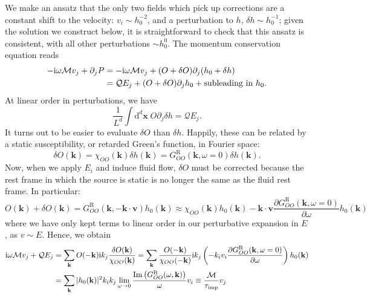 \documentclass[10pt, oneside]{book}
\begin{document}
\begin{doublespace}
We make an ansatz that the only two fields which pick up corrections are a constant shift to the velocity: $v_i \sim h_0^{-2}$,  and a perturbation to $h$, $\delta h\sim h^{-1}_0$;  given the solution we construct below, it is straightforward to check that this ansatz is consistent, with all other perturbations $\sim h^0_0$.    The momentum conservation equation reads \begin{align}
-\mathrm{i}\omega \mathcal{M} v_j + \partial_j P &= -\mathrm{i}\omega\mathcal{M} v_j  +  (O + \delta O) \partial_j (h_0+\delta h) \notag \\
&= \mathcal{Q}E_j + (O+\delta O)\partial_j h_0 + \text{subleading in }h_0.   \label{eq:233}
\end{align}At linear order in perturbations, we have \begin{equation}
\frac{1}{L^d}\int \mathrm{d}^d\mathbf{x}\; O\partial_j \delta h = \mathcal{Q}E_j. 
\end{equation}
It turns out to be easier to evaluate $\delta O$ than $\delta h$.  Happily, these can be related by a static susceptibility, or retarded Green's function, in Fourier space: \begin{equation}
\delta O(\mathbf{k}) = \chi_{OO}(\mathbf{k}) \delta h(\mathbf{k}) = G^{\mathrm{R}}_{OO}(\mathbf{k},\omega=0) \delta h(\mathbf{k}).   \label{eq:chiOO}
\end{equation}
Now, when we apply $E_i$ and induce fluid flow, $\delta O$ must be corrected because the rest frame in which the source is static is no longer the same as the fluid rest frame.  In particular: \begin{equation}
O(\mathbf{k}) + \delta O(\mathbf{k}) = G^{\mathrm{R}}_{OO}(\mathbf{k},-\mathbf{k}\cdot \mathbf{v}) h_0(\mathbf{k}) \approx \chi_{OO}(\mathbf{k}) h_0(\mathbf{k}) - \mathbf{k}\cdot \mathbf{v} \frac{\partial G^{\mathrm{R}}_{OO}(\mathbf{k},\omega = 0)}{\partial \omega} h_0(\mathbf{k}) 
\end{equation}
where we have only kept terms to linear order in our perturbative expansion in $E$, as $v\sim E$.   Hence, we obtain \begin{align}
\mathrm{i}\omega \mathcal{M} v_j +\mathcal{Q}E_j &= \sum_{\mathbf{k}} O(-\mathbf{k}) \mathrm{i}k_j \frac{\delta O(\mathbf{k})}{\chi_{OO}(\mathbf{k})} = \sum_{\mathbf{k}} \frac{O(-\mathbf{k})}{\chi_{OO}(\mathbf{-k})} \mathrm{i}k_j \left(-k_i v_i \frac{\partial G^{\mathrm{R}}_{OO}(\mathbf{k},\omega = 0)}{\partial \omega}\right) h_0(\mathbf{k}) \notag \\
&= \sum_{\mathbf{k}}  |h_0(\mathbf{k})|^2 k_i k_j \lim_{\omega\rightarrow 0} \frac{\mathrm{Im}\left(G^{\mathrm{R}}_{OO}(\omega,\mathbf{k})\right)}{\omega} v_i \equiv \frac{\mathcal{M}}{\tau_{\mathrm{imp}}} v_j

\end{align}
\end{doublespace}
\end{document}
